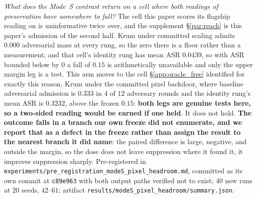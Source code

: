 \documentclass{article}
\begin{document}
\noindent \emph{What does the Mode~S contrast return on a cell where both readings of preservation have somewhere to fall?} The cell this paper scores its flagship reading on is uninformative twice over, and the supplement §\ref{par:reach} is this paper's admission of the second half. Krum under committed scaling admits $0.000$ adversarial mass at every rung, so the zero there is a floor rather than a measurement; and that cell's identity rung has mean ASR $0.0439$, so with ASR bounded below by $0$ a fall of $0.15$ is arithmetically unavailable and only the upper margin leg is a test. This arm moves to the cell §\ref{app:oracle_free} identified for exactly this reason, Krum under the committed pixel backdoor, where baseline adversarial admission is $0.333$ in $4$ of $12$ adversary rounds and the identity rung's mean ASR is $0.3232$, above the frozen $0.15$: \textbf{both legs are genuine tests here, so a two-sided reading would be earned if one held}. It does not hold. \textbf{The outcome falls in a branch our own freeze did not enumerate, and we report that as a defect in the freeze rather than assign the result to the nearest branch it did name}: the paired difference is large, negative, and outside the margin, so the dose does not leave suppression where it found it, it improves suppression sharply. Pre-registered in \texttt{experiments/\allowbreak pre\_registration\_\allowbreak modeS\_\allowbreak pixel\_\allowbreak headroom.md}, committed as its own commit at \texttt{c89e963} with both output paths verified not to exist; $40$ new runs at $20$ seeds, $42$--$61$; artifact \texttt{results/\allowbreak modeS\_\allowbreak pixel\_\allowbreak headroom/\allowbreak summary.json}.
\end{document}
